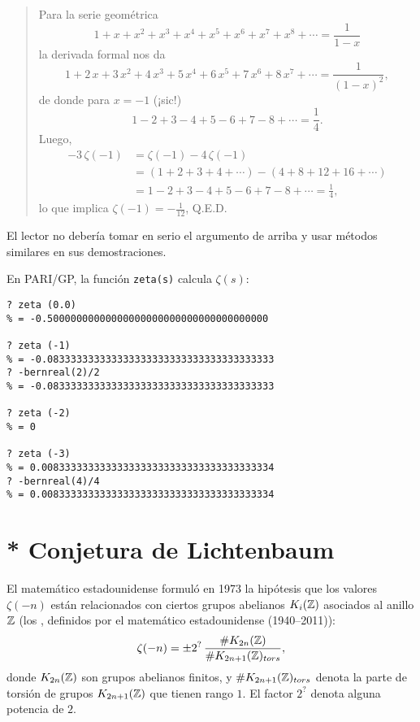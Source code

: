 \documentclass{article}
\numberwithin{equation}{section}
\theoremstyle{definition}
\begin{document}
\begin{quote}
  Para la serie geométrica
  $$1 + x + x^2 + x^3 + x^4 + x^5 + x^6 + x^7 + x^8 + \cdots = \frac{1}{1-x}$$
  la derivada formal nos da
  $$1 + 2\,x + 3\,x^2 + 4\,x^3 + 5\,x^4 + 6\,x^5 + 7\,x^6 + 8\,x^7 + \cdots = \frac{1}{(1-x)^2},$$
  de donde para $x = -1$ (¡sic!)
  $$1 - 2 + 3 - 4 + 5 - 6 + 7 - 8 + \cdots = \frac{1}{4}.$$
  Luego,
  \begin{align*}
    -3\,\zeta (-1) & = \zeta (-1) - 4\,\zeta (-1) \\
                   & = (1 + 2 + 3 + 4 + \cdots) - (4 + 8 + 12 + 16 + \cdots) \\
                   & = 1 - 2 + 3 - 4 + 5 - 6 + 7 - 8 + \cdots = \frac{1}{4},
  \end{align*}
  lo que implica $\zeta (-1) = -\frac{1}{12}$, Q.E.D.
\end{quote}

El lector no debería tomar en serio el argumento de arriba y usar métodos
similares en sus demostraciones.

\begin{shaded}
  \small\noindent En PARI/GP, la función \verb|zeta(s)| calcula $\zeta (s)$:

\begin{verbatim}
? zeta (0.0)
% = -0.50000000000000000000000000000000000000

? zeta (-1)
% = -0.083333333333333333333333333333333333333
? -bernreal(2)/2
% = -0.083333333333333333333333333333333333333

? zeta (-2)
% = 0

? zeta (-3)
% = 0.0083333333333333333333333333333333333334
? -bernreal(4)/4
% = 0.0083333333333333333333333333333333333334
\end{verbatim}
\end{shaded}


\section{* Conjetura de Lichtenbaum}

El matemático estadounidense  formuló en 1973
la hipótesis que los valores $\zeta (-n)$ están relacionados con ciertos grupos
abelianos $K_i (\mathbb{Z})$ asociados al anillo $\mathbb{Z}$ (los , definidos
por el matemático estadounidense  (1940--2011)):
$$\zeta (-n) = \pm 2^? \, \frac{\# K_{2n} (\mathbb{Z})}{\# K_{2n+1} (\mathbb{Z})_{tors}},$$
donde $K_{2n} (\mathbb{Z})$ son grupos abelianos finitos, y $\# K_{2n+1} (\mathbb{Z})_{tors}$
denota la parte de torsión de grupos $K_{2n+1} (\mathbb{Z})$ que tienen rango $1$.
El factor $2^?$ denota alguna potencia de $2$.
\end{document}
